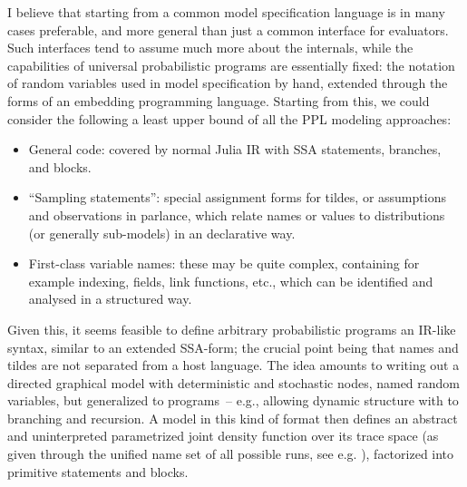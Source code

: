 I believe that starting from a common model specification language is in many cases preferable, and
more general than just a common interface for evaluators.  Such interfaces tend to assume much more
about the internals, while the capabilities of universal probabilistic programs are essentially
fixed: the notation of random variables used in model specification by hand, extended through the
forms of an embedding programming language.  Starting from this, we could consider the following a
least upper bound of all the PPL modeling approaches:
\begin{itemize}
  \firmlist
\item General code: covered by normal Julia IR with SSA statements, branches, and blocks.
\item \enquote{Sampling statements}: special assignment forms for tildes, or assumptions and
  observations in \turingjl{} parlance, which relate names or values to distributions (or generally
  sub-models) in an declarative way.
\item First-class variable names: these may be quite complex, containing for example indexing,
  fields, link functions, etc., which can be identified and analysed in a structured way.
\end{itemize}
Given this, it seems feasible to define arbitrary probabilistic programs an IR-like syntax, similar
to an extended SSA-form; the crucial point being that names and tildes are not separated from a host
language.  The idea amounts to writing out a directed graphical model with deterministic and
stochastic nodes, named random variables, but generalized to programs~-- e.g., allowing dynamic
structure with to branching and recursion.  A model in this kind of format then defines an abstract
and uninterpreted parametrized joint density function over its trace space (as given through the
unified name set of all possible runs, see e.g. \textcite{lew2020trace}), factorized into primitive
statements and blocks.

